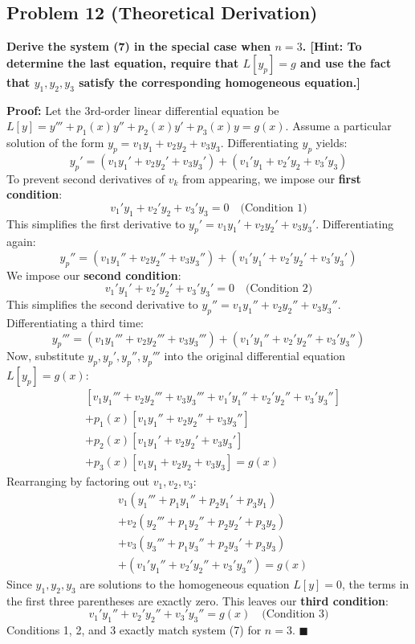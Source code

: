 \documentclass[12pt]{article}
\begin{document}
\subsection{Problem 12 (Theoretical Derivation)}
\textbf{Derive the system (7) in the special case when $n=3$. [Hint: To determine the last equation, require that $L[y_p] = g$ and use the fact that $y_1, y_2, y_3$ satisfy the corresponding homogeneous equation.]}

\textbf{Proof:}
Let the 3rd-order linear differential equation be $L[y] = y''' + p_1(x)y'' + p_2(x)y' + p_3(x)y = g(x)$.
Assume a particular solution of the form $y_p = v_1 y_1 + v_2 y_2 + v_3 y_3$.
Differentiating $y_p$ yields:
\[ y_p' = (v_1 y_1' + v_2 y_2' + v_3 y_3') + (v_1' y_1 + v_2' y_2 + v_3' y_3) \]
To prevent second derivatives of $v_k$ from appearing, we impose our \textbf{first condition}:
\[ v_1' y_1 + v_2' y_2 + v_3' y_3 = 0 \quad \text{(Condition 1)} \]
This simplifies the first derivative to $y_p' = v_1 y_1' + v_2 y_2' + v_3 y_3'$.
Differentiating again:
\[ y_p'' = (v_1 y_1'' + v_2 y_2'' + v_3 y_3'') + (v_1' y_1' + v_2' y_2' + v_3' y_3') \]
We impose our \textbf{second condition}:
\[ v_1' y_1' + v_2' y_2' + v_3' y_3' = 0 \quad \text{(Condition 2)} \]
This simplifies the second derivative to $y_p'' = v_1 y_1'' + v_2 y_2'' + v_3 y_3''$.
Differentiating a third time:
\[ y_p''' = (v_1 y_1''' + v_2 y_2''' + v_3 y_3''') + (v_1' y_1'' + v_2' y_2'' + v_3' y_3'') \]
Now, substitute $y_p, y_p', y_p'', y_p'''$ into the original differential equation $L[y_p] = g(x)$:
\begin{align*}
&[v_1 y_1''' + v_2 y_2''' + v_3 y_3''' + v_1' y_1'' + v_2' y_2'' + v_3' y_3''] \\
&+ p_1(x)[v_1 y_1'' + v_2 y_2'' + v_3 y_3''] \\
&+ p_2(x)[v_1 y_1' + v_2 y_2' + v_3 y_3'] \\
&+ p_3(x)[v_1 y_1 + v_2 y_2 + v_3 y_3] = g(x)
\end{align*}
Rearranging by factoring out $v_1, v_2, v_3$:
\begin{align*}
&v_1(y_1''' + p_1 y_1'' + p_2 y_1' + p_3 y_1) \\
&+ v_2(y_2''' + p_1 y_2'' + p_2 y_2' + p_3 y_2) \\
&+ v_3(y_3''' + p_1 y_3'' + p_2 y_3' + p_3 y_3) \\
&+ (v_1' y_1'' + v_2' y_2'' + v_3' y_3'') = g(x)
\end{align*}
Since $y_1, y_2, y_3$ are solutions to the homogeneous equation $L[y]=0$, the terms in the first three parentheses are exactly zero. This leaves our \textbf{third condition}:
\[ v_1' y_1'' + v_2' y_2'' + v_3' y_3'' = g(x) \quad \text{(Condition 3)} \]
Conditions 1, 2, and 3 exactly match system (7) for $n=3$. $\blacksquare$
\end{document}
